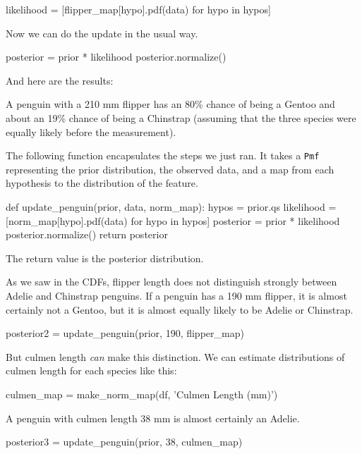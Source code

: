 \documentclass[12pt]{book}
\theoremstyle{exercise}
\newcommand{\py}[1]{{\tt #1}}%
\begin{document}
\begin{code}
likelihood = [flipper_map[hypo].pdf(data) for hypo in hypos]
\end{code}

Now we can do the update in the usual way.

\begin{code}
posterior = prior * likelihood
posterior.normalize()
\end{code}

And here are the results:



A penguin with a 210 mm flipper has an 80\% chance of being a Gentoo and
about an 19\% chance of being a Chinstrap (assuming that the three
species were equally likely before the measurement).

The following function encapsulates the steps we just ran. It takes a
\py{Pmf} representing the prior distribution, the
observed data, and a map from each hypothesis to the distribution of the
feature.

\begin{code}
def update_penguin(prior, data, norm_map):
    hypos = prior.qs
    likelihood = [norm_map[hypo].pdf(data) for hypo in hypos]
    posterior = prior * likelihood
    posterior.normalize()
    return posterior
\end{code}

The return value is the posterior distribution.

As we saw in the CDFs, flipper length does not distinguish strongly
between Adelie and Chinstrap penguins. If a penguin has a 190 mm
flipper, it is almost certainly not a Gentoo, but it is almost equally
likely to be Adelie or Chinstrap.

\begin{code}
posterior2 = update_penguin(prior, 190, flipper_map)
\end{code}

But culmen length \emph{can} make this distinction. We can estimate
distributions of culmen length for each species like this:

\begin{code}
culmen_map = make_norm_map(df, 'Culmen Length (mm)')
\end{code}

A penguin with culmen length 38 mm is almost certainly an Adelie.

\begin{code}
posterior3 = update_penguin(prior, 38, culmen_map)
\end{code}
\end{document}
